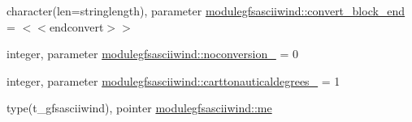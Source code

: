 \begin{DoxyCompactItemize}
\item 
character(len=stringlength), parameter \mbox{\hyperlink{namespacemodulegfsasciiwind_aaa6e5d0628451ecaf95e028d77e17e74}{modulegfsasciiwind\+::convert\+\_\+block\+\_\+end}} = \textquotesingle{}$<$$<$endconvert$>$$>$\textquotesingle{}
\item 
integer, parameter \mbox{\hyperlink{namespacemodulegfsasciiwind_af0862756eafdf97c8c8176091c7b87e8}{modulegfsasciiwind\+::noconversion\+\_\+}} = 0
\item 
integer, parameter \mbox{\hyperlink{namespacemodulegfsasciiwind_a0a6e81b60bce37217f1aa7c7cb238e61}{modulegfsasciiwind\+::carttonauticaldegrees\+\_\+}} = 1
\item 
type(t\+\_\+gfsasciiwind), pointer \mbox{\hyperlink{namespacemodulegfsasciiwind_ae4f2c81a144ab1609763f342a186c40d}{modulegfsasciiwind\+::me}}
\end{DoxyCompactItemize}
